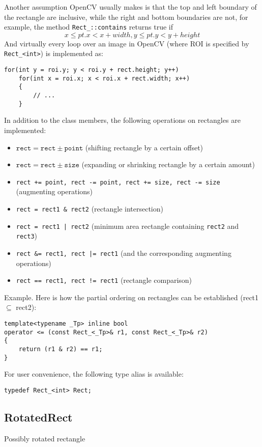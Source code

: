 Another assumption OpenCV usually makes is that the top and left boundary of the rectangle are inclusive, while the right and bottom boundaries are not, for example, the method \texttt{Rect\_::contains} returns true if
\[
      x \leq pt.x < x+width,
      y \leq pt.y < y+height
\]
And virtually every loop over an image  in OpenCV (where ROI is specified by \texttt{Rect\_<int>}) is implemented as:
\begin{lstlisting}
for(int y = roi.y; y < roi.y + rect.height; y++)
    for(int x = roi.x; x < roi.x + rect.width; x++)
    {
        // ...
    }
\end{lstlisting}

In addition to the class members, the following operations on rectangles are implemented:
\begin{itemize}
    \item $\texttt{rect} = \texttt{rect} \pm \texttt{point}$ (shifting rectangle by a certain offset)
    \item $\texttt{rect} = \texttt{rect} \pm \texttt{size}$ (expanding or shrinking rectangle by a certain amount)
    \item \texttt{rect += point, rect -= point, rect += size, rect -= size} (augmenting operations)
    \item \texttt{rect = rect1 \& rect2} (rectangle intersection)
    \item \texttt{rect = rect1 | rect2} (minimum area rectangle containing \texttt{rect2} and \texttt{rect3})
    \item \texttt{rect \&= rect1, rect |= rect1} (and the corresponding augmenting operations)
    \item \texttt{rect == rect1, rect != rect1} (rectangle comparison)
\end{itemize}

Example. Here is how the partial ordering on rectangles can be established (rect1 $\subseteq$ rect2):
\begin{lstlisting}
template<typename _Tp> inline bool
operator <= (const Rect_<_Tp>& r1, const Rect_<_Tp>& r2)
{
    return (r1 & r2) == r1;
}
\end{lstlisting}

For user convenience, the following type alias is available:
\begin{lstlisting}
typedef Rect_<int> Rect;
\end{lstlisting}

\subsection{RotatedRect}\label{RotatedRect}
Possibly rotated rectangle

